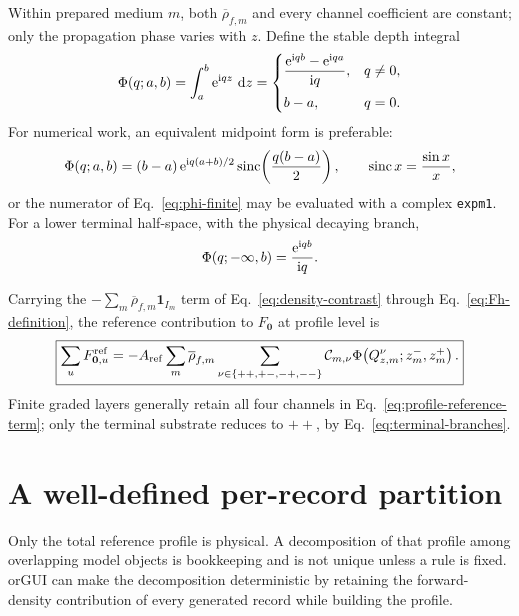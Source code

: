 Within prepared medium $m$, both $\overline\rho_{f,m}$ and every channel
coefficient are constant; only the propagation phase varies with $z$.  Define
the stable depth integral
\begin{equation}
  \Phi(q;a,b)
  =\int_a^b\mathrm{e}^{\mathrm{i} qz}\,\mathop{}\!\mathrm{d} z
  =\begin{cases}
    \dfrac{\mathrm{e}^{\mathrm{i} qb}-\mathrm{e}^{\mathrm{i} qa}}{\mathrm{i} q}, & q\neq0,\\[3mm]
    b-a, & q=0.
  \end{cases}
  \label{eq:phi-finite}
\end{equation}
For numerical work, an equivalent midpoint form is preferable:
\begin{equation}
  \Phi(q;a,b)
  =(b-a)\,
   \mathrm{e}^{\mathrm{i} q(a+b)/2}
   \operatorname{sinc}\!\left(\frac{q(b-a)}{2}\right),
  \qquad
  \operatorname{sinc}x=\frac{\sin x}{x},
  \label{eq:phi-sinc}
\end{equation}
or the numerator of Eq.~\eqref{eq:phi-finite} may be evaluated with a complex
\texttt{expm1}.  For a lower terminal half-space, with the physical decaying
branch,
\begin{equation}
  \Phi(q;-\infty,b)=\frac{\mathrm{e}^{\mathrm{i} qb}}{\mathrm{i} q}.
  \label{eq:phi-half-space}
\end{equation}

Carrying the $-\sum_m\overline\rho_{f,m}\mathbf 1_{I_m}$ term of
Eq.~\eqref{eq:density-contrast} through Eq.~\eqref{eq:Fh-definition}, the
reference contribution to $F_{\bm 0}$ at profile level is
\begin{equation}
  \boxed{
  \sum_uF_{\bm 0,u}^{\rm ref}
  =-A_{\rm ref}
   \sum_m\overline\rho_{f,m}
   \sum_{\nu\in\{++,+-,-+,--\}}
   \mathcal C_{m,\nu}
   \Phi\!\left(Q_{z,m}^{\nu};z_m^-,z_m^+\right).
  }
  \label{eq:profile-reference-term}
\end{equation}
Finite graded layers generally retain all four channels in
Eq.~\eqref{eq:profile-reference-term}; only the terminal substrate reduces to
$++$, by Eq.~\eqref{eq:terminal-branches}.

\section{A well-defined per-record partition}

Only the total reference profile is physical.  A decomposition of that profile
among overlapping model objects is bookkeeping and is not unique unless a
rule is fixed.  orGUI can make the decomposition deterministic by retaining
the forward-density contribution of every generated record while building the
profile.

